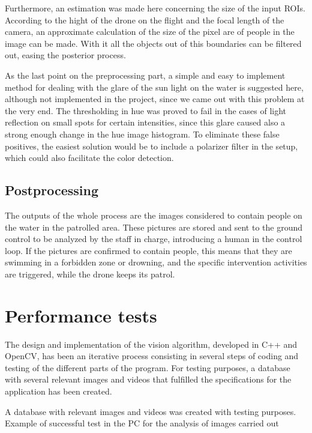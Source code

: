 Furthermore, an estimation was made here concerning the size of the input ROIs. 
According to the hight of the drone on the flight and the focal length of the camera, an approximate calculation of the size of the pixel are of people in the image can be made. 
With it all the objects out of this boundaries can be filtered out, easing the posterior process.

As the last point on the preprocessing part, a simple and easy to implement method for dealing with the glare of the sun light on the water is suggested here, although not implemented in the project, since we came out with this problem at the very end.
The thresholding in hue was proved to fail in the cases of light reflection on small spots for certain intensities, since this glare caused also a strong enough change in the hue image histogram. To eliminate these false positives, the easiest solution would be to include a polarizer filter in the setup, which could also facilitate the color detection. 

\subsection{Postprocessing}
The outputs of the whole process are the images considered to contain people on the water in the patrolled area. 
These pictures are stored and sent to the ground control to be analyzed by the staff in charge, introducing a human in the control loop.
If the pictures are confirmed to contain people, this means that they are swimming in a forbidden zone or drowning, and the specific intervention activities are triggered, while the drone keeps its patrol. 

\section{Performance tests}
The design and implementation of the vision algorithm, developed in C++ and OpenCV, has been an iterative process consisting in several steps of coding and testing of the different parts of the program. 
For testing purposes, a database with several relevant images and videos that fulfilled the specifications for the application has been created. %

A database with relevant images and videos was created with testing purposes.\\

Example of successful test in the PC for the analysis of images carried out

